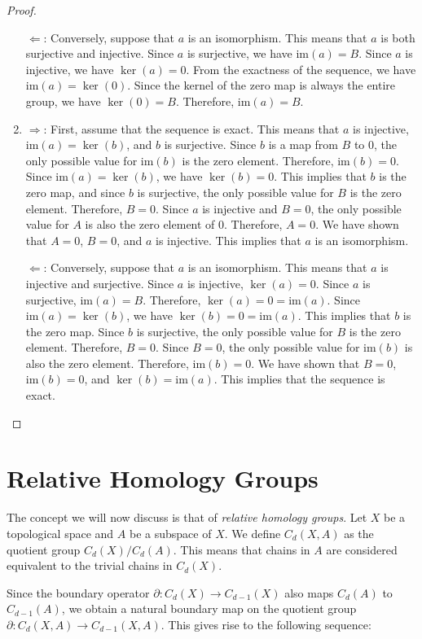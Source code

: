 \documentclass{amsart}
\begin{document}
\begin{proof}
\begin{enumerate}
	\glqq $\Leftarrow$\grqq{}: Conversely, suppose that $a$ is an isomorphism. This means that $a$ is both surjective and injective. Since $a$ is surjective, we have $\text{im}(a) = B$. Since $a$ is injective, we have $\ker(a) = 0$. From the exactness of the sequence, we have $\text{im}(a) = \ker(0)$. Since the kernel of the zero map is always the entire group, we have $\ker(0) = B$. Therefore, $\text{im}(a) = B$.
	\item \glqq $\Rightarrow$\grqq{}: First, assume that the sequence is exact. This means that $a$ is injective, $\text{im}(a) = \ker(b)$, and $b$ is surjective. Since $b$ is a map from $B$ to $0$, the only possible value for $\text{im}(b)$ is the zero element. Therefore, $\text{im}(b) = 0$. Since $\text{im}(a) = \ker(b)$, we have $\ker(b) = 0$. This implies that $b$ is the zero map, and since $b$ is surjective, the only possible value for $B$ is the zero element. Therefore, $B = 0$. Since $a$ is injective and $B = 0$, the only possible value for $A$ is also the zero element of $0$. Therefore, $A = 0$. We have shown that $A = 0$, $B = 0$, and $a$ is injective. This implies that $a$ is an isomorphism.

	\glqq $\Leftarrow$\grqq{}: Conversely, suppose that $a$ is an isomorphism. This means that $a$ is injective and surjective. Since $a$ is injective, $\ker(a) = 0$. Since $a$ is surjective, $\text{im}(a) = B$. Therefore, $\ker(a) = 0 = \text{im}(a)$. Since $\text{im}(a) = \ker(b)$, we have $\ker(b) = 0 = \text{im}(a)$. This implies that $b$ is the zero map. Since $b$ is surjective, the only possible value for $B$ is the zero element. Therefore, $B = 0$. Since $B = 0$, the only possible value for $\text{im}(b)$ is also the zero element. Therefore, $\text{im}(b) = 0$. We have shown that $B = 0$, $\text{im}(b) = 0$, and $\ker(b) = \text{im}(a)$. This implies that the sequence is exact.
\end{enumerate}
\end{proof}

\section{Relative Homology Groups}
The concept we will now discuss is that of \emph{relative homology groups}. Let $X$ be a topological space and $A$ be a subspace of $X$. We define $C_d(X,A)$ as the quotient group $C_d(X)/C_d(A)$. This means that chains in $A$ are considered equivalent to the trivial chains in $C_d(X)$.

Since the boundary operator $\partial: C_d(X) \rightarrow C_{d-1}(X)$ also maps $C_d(A)$ to $C_{d-1}(A)$, we obtain a natural boundary map on the quotient group $\partial: C_d(X,A) \rightarrow C_{d-1}(X,A)$. This gives rise to the following sequence:
\end{document}
